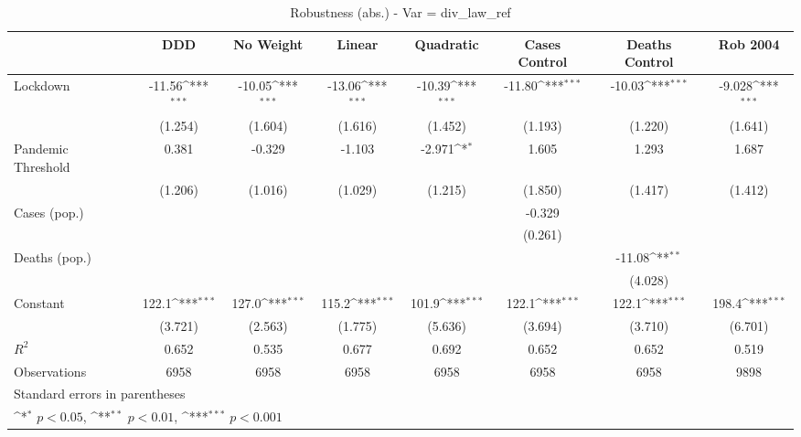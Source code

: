 \documentclass{article}
\begin{document}
{
\def\sym#1{\ifmmode^{#1}\else\(^{#1}\)\fi}
\begin{longtable}{l*{7}{c}}
\caption{Robustness (abs.) - Var = div\_law\_ref}\\
\hline\hline\endfirsthead\hline\endhead\hline\endfoot\endlastfoot
                &\multicolumn{1}{c}{DDD}&\multicolumn{1}{c}{No Weight}&\multicolumn{1}{c}{Linear}&\multicolumn{1}{c}{Quadratic}&\multicolumn{1}{c}{Cases Control}&\multicolumn{1}{c}{Deaths Control}&\multicolumn{1}{c}{Rob 2004}\\
\hline
Lockdown        &   -11.56\sym{***}&   -10.05\sym{***}&   -13.06\sym{***}&   -10.39\sym{***}&   -11.80\sym{***}&   -10.03\sym{***}&   -9.028\sym{***}\\
                &  (1.254)         &  (1.604)         &  (1.616)         &  (1.452)         &  (1.193)         &  (1.220)         &  (1.641)         \\
Pandemic Threshold&    0.381         &   -0.329         &   -1.103         &   -2.971\sym{*}  &    1.605         &    1.293         &    1.687         \\
                &  (1.206)         &  (1.016)         &  (1.029)         &  (1.215)         &  (1.850)         &  (1.417)         &  (1.412)         \\
Cases (pop.)    &                  &                  &                  &                  &   -0.329         &                  &                  \\
                &                  &                  &                  &                  &  (0.261)         &                  &                  \\
Deaths (pop.)   &                  &                  &                  &                  &                  &   -11.08\sym{**} &                  \\
                &                  &                  &                  &                  &                  &  (4.028)         &                  \\
Constant        &    122.1\sym{***}&    127.0\sym{***}&    115.2\sym{***}&    101.9\sym{***}&    122.1\sym{***}&    122.1\sym{***}&    198.4\sym{***}\\
                &  (3.721)         &  (2.563)         &  (1.775)         &  (5.636)         &  (3.694)         &  (3.710)         &  (6.701)         \\
\hline
\(R^{2}\)       &    0.652         &    0.535         &    0.677         &    0.692         &    0.652         &    0.652         &    0.519         \\
Observations    &     6958         &     6958         &     6958         &     6958         &     6958         &     6958         &     9898         \\
\hline\hline
\multicolumn{8}{l}{\footnotesize Standard errors in parentheses}\\
\multicolumn{8}{l}{\footnotesize \sym{*} \(p<0.05\), \sym{**} \(p<0.01\), \sym{***} \(p<0.001\)}\\
\end{longtable}
}
\end{document}
